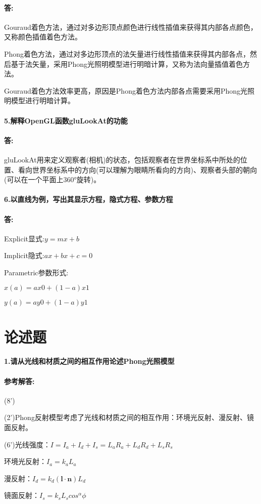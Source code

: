 \documentclass[12pt,a4paper,UTF8]{ctexart}
\begin{document}
	\paragraph{答:}Gouraud着色方法，通过对多边形顶点颜色进行线性插值来获得其内部各点颜色，又称颜色插值着色方法。
	\par Phong着色方法，通过对多边形顶点的法矢量进行线性插值来获得其内部各点，然后基于法矢量，采用Phong光照明模型进行明暗计算，又称为法向量插值着色方法。
	\par Gouraud着色方法效率更高，原因是Phong着色方法内部各点需要采用Phong光照明模型进行明暗计算。
	\paragraph{5.解释OpenGL函数gluLookAt的功能}
	\paragraph{答:}gluLookAt用来定义观察者(相机)的状态，包括观察者在世界坐标系中所处的位置、看向世界坐标系中的方向(可以理解为眼睛所看向的方向)、观察者头部的朝向(可以在一个平面上360°旋转)。
	\paragraph{6.以直线为例，写出其显示方程，隐式方程、参数方程}
	\paragraph{答:}Explicit显式:$y=mx+b$  %
	\par Implicit隐式:$ax+bx+c=0$
	\par Parametric参数形式:
	\par \quad $x(a)=ax0+(1-a)x1$
	\par \quad $y(a)=ay0+(1-a)y1$
	
	\section{论述题}
	\paragraph{1.请从光线和材质之间的相互作用论述Phong光照模型}
	\paragraph{参考解答:}(8')
	\par (2')Phong反射模型考虑了光线和材质之间的相互作用：环境光反射、漫反射、镜面反射。
	\par (6')光线强度：$I=I_{a}+I_{d}+I_{s}=L_{a}R_{a}+L_{d}R_{d}+L_{s}R_{s}$
	\par 环境光反射：$I_{a}=k_{a}L_{a}$
	\par 漫反射：$I_{d}=k_{d}(\boldsymbol l\cdot \boldsymbol n)L_{d}$  %
	\par 镜面反射：$I_{s}=k_{s}L_{s}cos^{\alpha}\phi$
\end{document}

